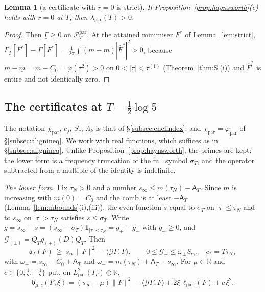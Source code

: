 \documentclass[11pt]{amsart}
\newtheorem{lemma}[theorem]{Lemma}
\theoremstyle{definition}
\theoremstyle{remark}
\newcommand{\R}{\mathbb R}
\newcommand{\PT}{\mathcal P_T}
\newcommand{\IT}{I_T}
\newcommand{\sT}{\sigma_T}
\newcommand{\Fh}{\widehat F}
\newcommand{\Aconst}{\mathsf A_T}
\begin{document}
\begin{lemma}[a certificate with $r=0$ is strict]\label{lem:rzero}
If Proposition~\ref{prop:haynsworth}(c) holds with $r=0$ at $T$, then
$\lambda_{\mathrm{par}}(T)>0$.
\end{lemma}
\begin{proof}
Then $\underline\Gamma\ge0$ on $\PT^{\mathrm{par}}$. At the attained minimiser $F^*$ of
Lemma~\ref{lem:strict}, $\Gamma_T[F^*]-\underline\Gamma[F^*]=\frac1{2\pi}\int(m-\underline m)|\Fh^*|^2>0$,
because $m-\underline m=m-C_0=\varphi(\tau^2)>0$ on $0<|\tau|<\tau^{(1)}$ (Theorem~\ref{thm:S}(i)) and
$\Fh^*$ is entire and not identically zero.
\end{proof}


\subsection{The certificates at \texorpdfstring{$T=\frac12\log5$}{T = (1/2) log 5}}\label{subsec:encllog5}
The notation $\chi_{\mathrm{par}}$, $e_j$, $S_c$, $\Lambda_k$ is that of \S\ref{subsec:enclindex}, and
$\chi_{\mathrm{par}}=\varphi_{\mathrm{par}}$ of \S\ref{subsec:alignineq}. We work with real functions, which
suffices as in \S\ref{subsec:alignineq}. Unlike Proposition~\ref{prop:haynsworth}, the primes are kept:
the lower form is a frequency truncation of the full symbol $\sT$, and the operator subtracted from a
multiple of the identity is indefinite.

\emph{The lower form.} Fix $\tau_N>0$ and a number $s_\infty\le m(\tau_N)-\Aconst$. Since $m$ is increasing
with $m(0)=C_0$ and the comb is at least $-\Aconst$ (Lemma~\ref{lem:mbounds}(i),(iii)), the even function
$\underline s$ equal to $\sT$ on $|\tau|\le\tau_N$ and to $s_\infty$ on $|\tau|>\tau_N$ satisfies
$\underline s\le\sT$. Write $g=s_\infty-\underline s=(s_\infty-\sT)\mathbf 1_{|\tau|<\tau_N}=g_+-g_-$ with
$g_\pm\ge0$, and $\mathcal G_{(\pm)}=Q_Tg_{(\pm)}(D)Q_T$. Then
\[
\mathfrak a_T(F)\ \ge\ s_\infty\|F\|^2-\langle\mathcal GF,F\rangle,\qquad
0\le\mathcal G_\pm\le\omega_\pm S_{c_*},\quad c_*=T\tau_N,
\]
with $\omega_+=s_\infty-C_0+\Aconst$ and $\omega_-=m(\tau_N)+\Aconst-s_\infty$. For $\mu\in\R$ and
$c\in\{0,\frac12,-\frac12\}$ put, on $L^2_{\mathrm{par}}(\IT)\oplus\R$,
\[
\mathfrak b_{\mu,c}(F,\xi)=(s_\infty-\mu)\|F\|^2-\langle\mathcal GF,F\rangle+2\xi\,\ell_{\mathrm{par}}(F)+c\,\xi^2 .
\]
\end{document}
